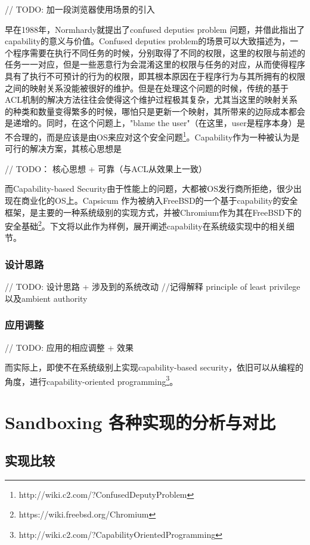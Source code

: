 \documentclass[final,12pt]{elsarticle}
\begin{document}
// TODO: 加一段浏览器使用场景的引入

早在1988年，Normhardy就提出了confused deputies problem \cite{deputies} 问题，并借此指出了capability的意义与价值。Confused deputies problem的场景可以大致描述为，一个程序需要在执行不同任务的时候，分别取得了不同的权限，这里的权限与前述的任务一一对应，但是一些恶意行为会混淆这里的权限与任务的对应，从而使得程序具有了执行不可预计的行为的权限，即其根本原因在于程序行为与其所拥有的权限之间的映射关系没能被很好的维护。但是在处理这个问题的时候，传统的基于ACL机制的解决方法往往会使得这个维护过程极其复杂，尤其当这里的映射关系的种类和数量变得繁多的时候，哪怕只是更新一个映射，其所带来的边际成本都会是递增的。同时，在这个问题上，"blame the user"（在这里，user是程序本身）是不合理的，而是应该是由OS来应对这个安全问题\footnote{http://wiki.c2.com/?ConfusedDeputyProblem}。Capability作为一种被认为是可行的解决方案，其核心思想是

// TODO： 核心思想 + 可靠（与ACL从效果上一致）

而Capability-based Security由于性能上的问题，大都被OS发行商所拒绝，很少出现在商业化的OS上。Capsicum \cite{capsicum} 作为被纳入FreeBSD的一个基于capability的安全框架，是主要的一种系统级别的实现方式，并被Chromium作为其在FreeBSD下的安全基础\footnote{https://wiki.freebsd.org/Chromium}。下文将以此作为样例，展开阐述capability在系统级实现中的相关细节。

\subsubsection{设计思路}
\label{sss:design}

// TODO: 设计思路 + 涉及到的系统改动
//记得解释 principle of least privilege以及ambient authority

\subsubsection{应用调整}
\label{sss:adoption}

// TODO: 应用的相应调整 + 效果

而实际上，即使不在系统级别上实现capability-based security，依旧可以从编程的角度，进行capability-oriented programming\footnote{http://wiki.c2.com/?CapabilityOrientedProgramming}。

\section{Sandboxing 各种实现的分析与对比}
\label{s:evaluation}

\subsection{实现比较}
\label{ss: comparision}
\end{document}

